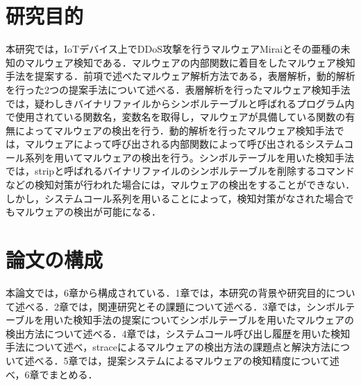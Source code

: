\section{研究目的}
本研究では，IoTデバイス上でDDoS攻撃を行うマルウェアMiraiとその亜種の未知のマルウェア検知である．マルウェアの内部関数に着目をしたマルウェア検知手法を提案する．前項で述べたマルウェア解析方法である，表層解析，動的解析を行った2つの提案手法について述べる．表層解析を行ったマルウェア検知手法では，疑わしきバイナリファイルからシンボルテーブルと呼ばれるプログラム内で使用されている関数名，変数名を取得し，マルウェアが具備している関数の有無によってマルウェアの検出を行う．動的解析を行ったマルウェア検知手法では，マルウェアによって呼び出される内部関数によって呼び出されるシステムコール系列を用いてマルウェアの検出を行う。シンボルテーブルを用いた検知手法では，stripと呼ばれるバイナリファイルのシンボルテーブルを削除するコマンドなどの検知対策が行われた場合には，マルウェアの検出をすることができない．しかし，システムコール系列を用いることによって，検知対策がなされた場合でもマルウェアの検出が可能になる．
　
\section{論文の構成}
本論文では，6章から構成されている．1章では，本研究の背景や研究目的について述べる．2章では，関連研究とその課題について述べる．3章では，シンボルテーブルを用いた検知手法の提案についてシンボルテーブルを用いたマルウェアの検出方法について述べる．4章では，システムコール呼び出し履歴を用いた検知手法について述べ，straceによるマルウェアの検出方法の課題点と解決方法について述べる．5章では，提案システムによるマルウェアの検知精度について述べ，6章でまとめる．%
